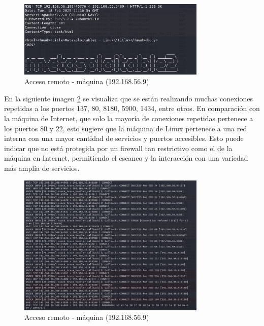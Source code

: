 \documentclass[a4paper,12pt]{article} %
\begin{document}
        \begin{figure} [hp!]
         \centering
         \includegraphics[width=0.8\textwidth]{Imagenes/meta.png}
         \caption{Acceso remoto - máquina (192.168.56.9) }
         \label{fig:wireshark2}
        \end{figure}

\newpage
   En la siguiente imagen \ref{fig:80diferente} se visualiza que se están realizando muchas conexiones repetidas a los puertos 137, 80, 8180, 5900, 1434, entre otros. En comparación con la máquina de Internet, que solo la mayoría de conexiones repetidas pertenece a los puertos 80 y 22, esto sugiere que la máquina de Linux pertenece a una red interna con una mayor cantidad de servicios y puertos accesibles. Esto puede indicar que no está protegida por un firewall tan restrictivo como el de la máquina en Internet, permitiendo el escaneo y la interacción con una variedad más amplia de servicios.

        \begin{figure} [hp!]
         \centering
         \includegraphics[width=0.8\textwidth]{Imagenes/puertosdiferentes80.png}
         \caption{Acceso remoto - máquina (192.168.56.9) }
         \label{fig:80diferente}
        \end{figure}
        
\end{document}
